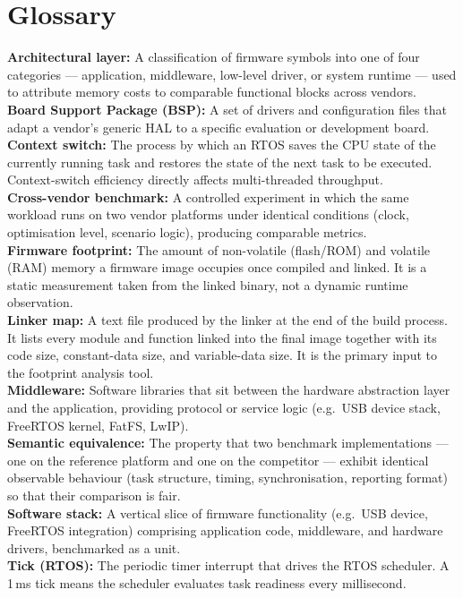 \chapter{Glossary}
\label{chap:Glossary}

\textbf{Architectural layer:} A classification of firmware symbols into one of four categories --- application, middleware, low-level driver, or system runtime --- used to attribute memory costs to comparable functional blocks across vendors.\\

\textbf{Board Support Package (BSP):} A set of drivers and configuration files that adapt a vendor's generic HAL to a specific evaluation or development board.\\

\textbf{Context switch:} The process by which an RTOS saves the CPU state of the currently running task and restores the state of the next task to be executed. Context-switch efficiency directly affects multi-threaded throughput.\\

\textbf{Cross-vendor benchmark:} A controlled experiment in which the same workload runs on two vendor platforms under identical conditions (clock, optimisation level, scenario logic), producing comparable metrics.\\

\textbf{Firmware footprint:} The amount of non-volatile (flash/ROM) and volatile (RAM) memory a firmware image occupies once compiled and linked. It is a static measurement taken from the linked binary, not a dynamic runtime observation.\\

\textbf{Linker map:} A text file produced by the linker at the end of the build process. It lists every module and function linked into the final image together with its code size, constant-data size, and variable-data size. It is the primary input to the footprint analysis tool.\\

\textbf{Middleware:} Software libraries that sit between the hardware abstraction layer and the application, providing protocol or service logic (e.g.\ USB device stack, FreeRTOS kernel, FatFS, LwIP).\\

\textbf{Semantic equivalence:} The property that two benchmark implementations --- one on the reference platform and one on the competitor --- exhibit identical observable behaviour (task structure, timing, synchronisation, reporting format) so that their comparison is fair.\\

\textbf{Software stack:} A vertical slice of firmware functionality (e.g.\ USB device, FreeRTOS integration) comprising application code, middleware, and hardware drivers, benchmarked as a unit.\\

\textbf{Tick (RTOS):} The periodic timer interrupt that drives the RTOS scheduler. A 1\,ms tick means the scheduler evaluates task readiness every millisecond.\\

\pagebreak